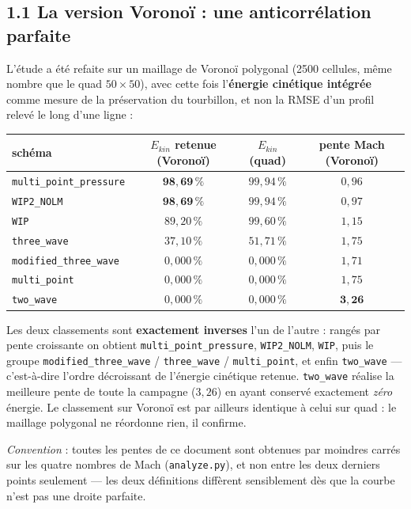 \documentclass[11pt,a4paper]{article}
\begin{document}
\subsection*{1.1 La version Voronoï : une anticorrélation parfaite}

L'étude a été refaite sur un maillage de Voronoï polygonal (2500 cellules, même
nombre que le quad $50\times50$), avec cette fois l'\textbf{énergie cinétique
intégrée} comme mesure de la préservation du tourbillon, et non la RMSE d'un
profil relevé le long d'une ligne :

\begin{table}[h]\centering
\begin{tabular}{lccc}
\toprule
schéma & $E_{kin}$ retenue (Voronoï) & $E_{kin}$ (quad) & pente Mach (Voronoï) \\
\midrule
\texttt{multi\_point\_pressure}& $\mathbf{98{,}69\,\%}$ & $99{,}94\,\%$ & $0{,}96$ \\
\texttt{WIP2\_NOLM}            & $\mathbf{98{,}69\,\%}$ & $99{,}94\,\%$ & $0{,}97$ \\
\texttt{WIP}                   & $89{,}20\,\%$ & $99{,}60\,\%$ & $1{,}15$ \\
\texttt{three\_wave}           & $37{,}10\,\%$ & $51{,}71\,\%$ & $1{,}75$ \\
\texttt{modified\_three\_wave} & \textcolor{BrickRed}{$0{,}000\,\%$} & $0{,}000\,\%$ & $1{,}71$ \\
\texttt{multi\_point}          & \textcolor{BrickRed}{$0{,}000\,\%$} & $0{,}000\,\%$ & $1{,}75$ \\
\texttt{two\_wave}             & \textcolor{BrickRed}{$0{,}000\,\%$} & $0{,}000\,\%$ & $\mathbf{3{,}26}$ \\
\bottomrule
\end{tabular}
\end{table}

Les deux classements sont \textbf{exactement inverses} l'un de l'autre : rangés
par pente croissante on obtient \texttt{multi\_point\_pressure},
\texttt{WIP2\_NOLM}, \texttt{WIP}, puis le groupe
\texttt{modified\_three\_wave} / \texttt{three\_wave} / \texttt{multi\_point},
et enfin \texttt{two\_wave} --- c'est-à-dire l'ordre décroissant de l'énergie
cinétique retenue. \texttt{two\_wave} réalise la meilleure pente de toute la
campagne ($3{,}26$) en ayant conservé exactement \emph{zéro} énergie. Le
classement sur Voronoï est par ailleurs identique à celui sur quad : le maillage
polygonal ne réordonne rien, il confirme.

\emph{Convention} : toutes les pentes de ce document sont obtenues par moindres
carrés sur les quatre nombres de Mach (\texttt{analyze.py}), et non entre les
deux derniers points seulement --- les deux définitions diffèrent sensiblement
dès que la courbe n'est pas une droite parfaite.
\end{document}
